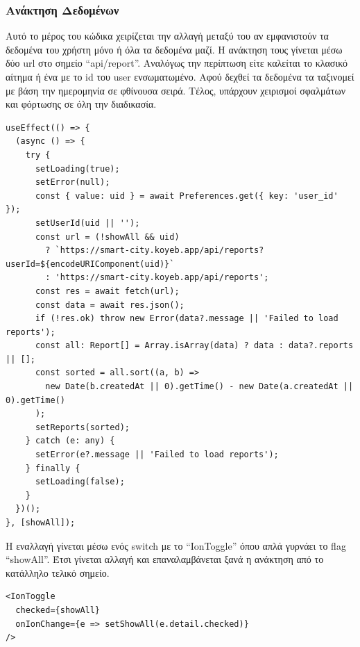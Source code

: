 \subsubsection*{Ανάκτηση Δεδομένων}
Αυτό το μέρος του κώδικα χειρίζεται την αλλαγή μεταξύ του αν εμφανιστούν τα δεδομένα του χρήστη μόνο ή όλα τα δεδομένα μαζί. Η ανάκτηση τους γίνεται μέσω δύο url στο σημείο “api/report”. Αναλόγως την περίπτωση είτε καλείται το κλασικό αίτημα ή ένα με το id του user ενσωματωμένο. Αφού δεχθεί τα δεδομένα τα ταξινομεί με βάση την ημερομηνία σε φθίνουσα σειρά. Τέλος, υπάρχουν χειρισμοί σφαλμάτων και φόρτωσης σε όλη την διαδικασία.
\\
\begin{lstlisting}
useEffect(() => {
  (async () => {
    try {
      setLoading(true);
      setError(null);
      const { value: uid } = await Preferences.get({ key: 'user_id' });
      setUserId(uid || '');
      const url = (!showAll && uid)
        ? `https://smart-city.koyeb.app/api/reports?userId=${encodeURIComponent(uid)}`
        : 'https://smart-city.koyeb.app/api/reports';
      const res = await fetch(url);
      const data = await res.json();
      if (!res.ok) throw new Error(data?.message || 'Failed to load reports');
      const all: Report[] = Array.isArray(data) ? data : data?.reports || [];
      const sorted = all.sort((a, b) =>
        new Date(b.createdAt || 0).getTime() - new Date(a.createdAt || 0).getTime()
      );
      setReports(sorted);
    } catch (e: any) {
      setError(e?.message || 'Failed to load reports');
    } finally {
      setLoading(false);
    }
  })();
}, [showAll]);
\end{lstlisting}
Η εναλλαγή γίνεται μέσω ενός switch με το “IonToggle” όπου απλά γυρνάει το flag “showAll”. Έτσι γίνεται αλλαγή και επαναλαμβάνεται ξανά η ανάκτηση από το κατάλληλο τελικό σημείο.

\begin{lstlisting}
<IonToggle
  checked={showAll}
  onIonChange={e => setShowAll(e.detail.checked)}
/>
\end{lstlisting}

